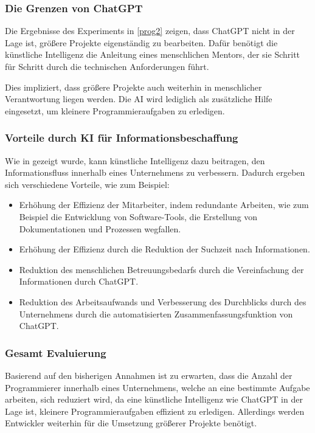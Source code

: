 \subsubsection{Die Grenzen von ChatGPT}
Die Ergebnisse des Experiments in \autoref{prog2} zeigen, dass ChatGPT nicht in der Lage ist, größere Projekte eigenständig zu bearbeiten. Dafür benötigt die künstliche Intelligenz die Anleitung eines menschlichen Mentors, der sie Schritt für Schritt durch die technischen Anforderungen führt.

Dies impliziert, dass größere Projekte auch weiterhin in menschlicher Verantwortung liegen werden. Die AI wird lediglich als zusätzliche Hilfe eingesetzt, um kleinere Programmieraufgaben zu erledigen.

\subsubsection{Vorteile durch KI für Informationsbeschaffung}
Wie in \label{informationsbeschaffungstool} gezeigt wurde, kann künstliche Intelligenz dazu beitragen, den Informationsfluss innerhalb eines Unternehmens zu verbessern. Dadurch ergeben sich verschiedene Vorteile, wie zum Beispiel:

\begin{itemize}
\item Erhöhung der Effizienz der Mitarbeiter, indem redundante Arbeiten, wie zum Beispiel die Entwicklung von Software-Tools, die Erstellung von Dokumentationen und Prozessen wegfallen.
\item Erhöhung der Effizienz durch die Reduktion der Suchzeit nach Informationen.
\item Reduktion des menschlichen Betreuungsbedarfs durch die Vereinfachung der Informationen durch ChatGPT.
\item Reduktion des Arbeitsaufwands und Verbesserung des Durchblicks durch des Unternehmens durch die automatisierten Zusammenfassungsfunktion von ChatGPT.
\end{itemize}


\subsubsection{Gesamt Evaluierung}
Basierend auf den bisherigen Annahmen ist zu erwarten, dass die Anzahl der Programmierer innerhalb eines Unternehmens, welche an eine bestimmte Aufgabe arbeiten, sich reduziert wird, da eine künstliche Intelligenz wie ChatGPT in der Lage ist, kleinere Programmieraufgaben effizient zu erledigen.
Allerdings werden Entwickler weiterhin für die Umsetzung größerer Projekte benötigt.

